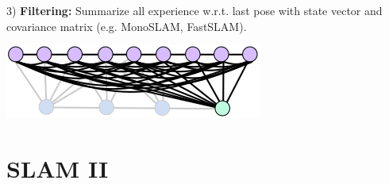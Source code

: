 \documentclass[landscape]{article}
\begin{document}
\begin{multicols}{3}
\begin{minipage}{\columnwidth}
  3) \textbf{Filtering:} Summarize all experience w.r.t. last pose with state
  vector and covariance matrix (e.g. MonoSLAM, FastSLAM).
  \vspace{-8pt}
  \begin{center}
    \includegraphics[width=0.5\columnwidth]{img/10_FilteringSLAM.png}
  \end{center}
\end{minipage}



\vfill


\section{SLAM II}



\end{multicols}
\end{document}
